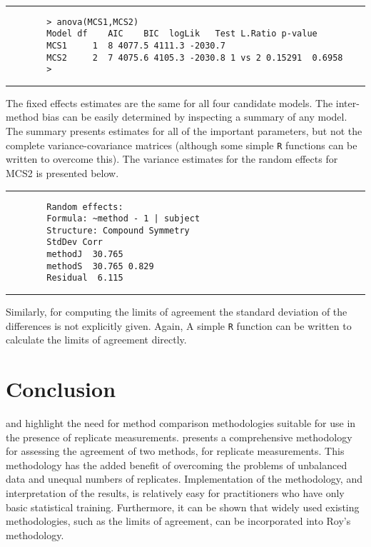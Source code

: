 \documentclass[12pt, a4paper]{report}
\theoremstyle{plain}
\theoremstyle{definition}
\theoremstyle{remark}
\begin{document}
		\\
		\hrule
		\begin{verbatim}
		> anova(MCS1,MCS2)
		Model df    AIC    BIC  logLik   Test L.Ratio p-value
		MCS1     1  8 4077.5 4111.3 -2030.7
		MCS2     2  7 4075.6 4105.3 -2030.8 1 vs 2 0.15291  0.6958
		>
		\end{verbatim}
		\hrule
		\vspace{1cm}
		The fixed effects estimates are the same for all four candidate models. The inter-method bias can be easily determined by inspecting a summary of any model. The summary presents estimates for all of the important parameters, but not the complete variance-covariance matrices (although some simple \texttt{R} functions can be written to overcome this). The variance estimates for the random effects for MCS2 is presented below.
		\\
		\hrule
		\begin{verbatim}
		Random effects:
		Formula: ~method - 1 | subject
		Structure: Compound Symmetry
		StdDev Corr
		methodJ  30.765
		methodS  30.765 0.829
		Residual  6.115
		\end{verbatim}
		\hrule
		\vspace{1cm}
		Similarly, for computing the limits of agreement the standard deviation of the differences is not explicitly given. Again, A simple \texttt{R} function can be written to calculate the limits of agreement directly.
		

		
		
		
	\section{Conclusion}
	\citet{BXC2008} and \citet{roy} highlight the need for method comparison methodologies suitable for use in the presence of replicate measurements. \citet{roy} presents a comprehensive methodology for assessing the agreement of two methods, for replicate measurements. This methodology has the added benefit of overcoming the problems of unbalanced data and unequal numbers of replicates. Implementation of the methodology, and interpretation of the results, is relatively easy for practitioners who have only basic statistical training. Furthermore, it can be shown that widely used existing methodologies, such as the limits of agreement, can be incorporated into Roy's methodology.
	

\end{document}
